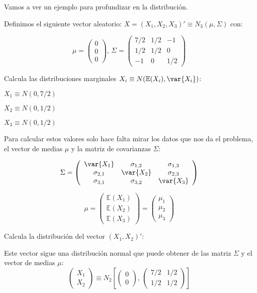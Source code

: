 Vamos a ver un ejemplo para profundizar en la distribución. 
\begin{example}
Definimos el siguiente vector aleatorio: $X = (X_1,X_2,X_3)' \equiv N_3(\mu, \Sigma)$ con:

\[
\mu=
\left(
\begin{array}{c}
0\\
0\\
0
\end{array}
\right) \text{,       }
\Sigma=
\left(
\begin{array}{ccc}
7/2& 1/2& -1 \\
1/2& 1/2& 0 \\
-1& 0& 1/2
\end{array}
\right)
\]

\ppart Calcula las distribuciones marginales $X_i \equiv N(\mathbb{E}(X_i), \var{X_i})$:

$X_1\equiv N(0, 7/2)$

$X_2\equiv N(0, 1/2)$

$X_3\equiv N(0, 1/2)$

Para calcular estos valores solo hace falta mirar los datos que nos da el problema, el vector de medias $\mu$ y la matriz de covarianzas $\Sigma$:

\[
\Sigma=\left(
\begin{array}{ccc}
\var{X_1}& \sigma_{1,2}& \sigma_{1,3} \\
\sigma_{2,1}& \var{X_2}& \sigma_{2,3} \\
\sigma_{3,1}& \sigma_{3,2}& \var{X_3}
\end{array}
\right)
\]

\[
\mu=
\left(
\begin{array}{c}
\mathbb{E}(X_1)\\
\mathbb{E}(X_2)\\
\mathbb{E}(X_3)
\end{array}
\right)=
\left(
\begin{array}{c}
\mu_1\\
\mu_2\\
\mu_3
\end{array}
\right)
\]

\ppart Calcula la distribución del vector $(X_1,X_2)'$:

Este vector sigue una distribución normal que puede obtener de las matriz $\Sigma$ y el vector de medias $\mu$:
\[
\left(
\begin{array}{c}
X_1\\
X_2
\end{array}
\right)
\equiv N_2\left[
\left(
\begin{array}{c}
0\\
0
\end{array}
\right)
\text{, }
\left(
\begin{array}{cc}
7/2& 1/2 \\
1/2 & 1/2
\end{array}
\right)
\right]
\]


\end{example}
